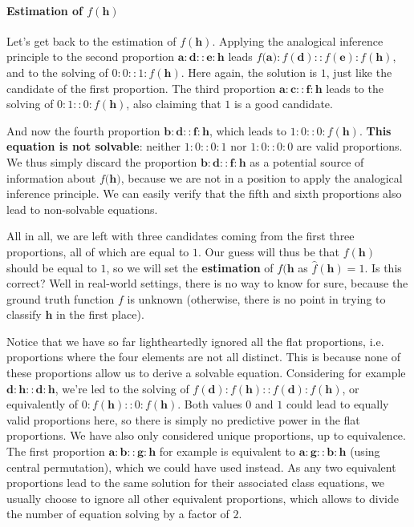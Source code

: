 \paragraph{Estimation of $f(\mathbf{h})$\\}

Let's get back to the estimation of $f(\mathbf{h})$. Applying the analogical
inference principle to the second proportion $\mathbf{a} : \mathbf{d} ::
\mathbf{e} : \mathbf{h}$ leads $f(\mathbf{a)} : f(\mathbf{d}) :: f(\mathbf{e})
: f(\mathbf{h})$, and to the solving of $0:0::1:f(\mathbf{h})$. Here again, the
solution is $1$, just like the candidate of the first proportion.
The third proportion  $\mathbf{a} : \mathbf{c} :: \mathbf{f} : \mathbf{h}$
leads to the solving of $0:1::0:f(\mathbf{h})$, also claiming that $1$ is a good candidate.

And now the fourth proportion $\mathbf{b} : \mathbf{d} :: \mathbf{f} :
\mathbf{h}$, which leads to $1:0::0:f(\mathbf{h})$. \textbf{This equation is not
solvable}: neither $1:0::0:1$ nor $1:0::0:0$ are valid proportions. We thus
simply discard the proportion $\mathbf{b} : \mathbf{d} :: \mathbf{f} :
\mathbf{h}$ as a potential source of information about $f(\mathbf{h)}$, because
we are not in a position to apply the analogical inference principle. We can
easily verify that the fifth and sixth proportions also lead to non-solvable
equations.

All in all, we are left with three candidates coming from the first three
proportions, all of which are equal to $1$. Our guess will thus be that
$f(\mathbf{h})$ should be equal to $1$, so we will set the \textbf{estimation} of
$f(\mathbf{h}$ as $\hat{f}(\mathbf{h}) = 1$. Is this correct? Well in real-world
settings, there is no way to know for sure, because the ground truth function
$f$ is unknown (otherwise, there is no point in trying to classify $\mathbf{h}$
in the first place).

Notice that we have so far lightheartedly ignored  all the flat proportions,
i.e. proportions where the four elements are not all distinct.
This is because none of these proportions allow us to derive a solvable
equation. Considering for example $\mathbf{d} : \mathbf{h} :: \mathbf{d} :
\mathbf{h}$, we're led to the solving of $f(\mathbf{d}) : f(\mathbf{h}) ::
f(\mathbf{d}) : f(\mathbf{h})$, or equivalently of $0 : f(\mathbf{h}) :: 0 :
f(\mathbf{h})$. Both values $0$ and $1$ could lead to equally valid proportions
here, so there is simply no predictive power in the flat proportions. We have
also only considered unique proportions, up to equivalence. The first proportion
$\mathbf{a} : \mathbf{b} :: \mathbf{g} : \mathbf{h}$ for example is equivalent
to $\mathbf{a} : \mathbf{g} :: \mathbf{b} : \mathbf{h}$ (using central
permutation), which we could have
used instead. As any two equivalent proportions lead to the same solution for
their associated class equations, we usually choose to ignore all other equivalent
proportions, which allows to divide the number of equation solving by a factor
of $2$.

